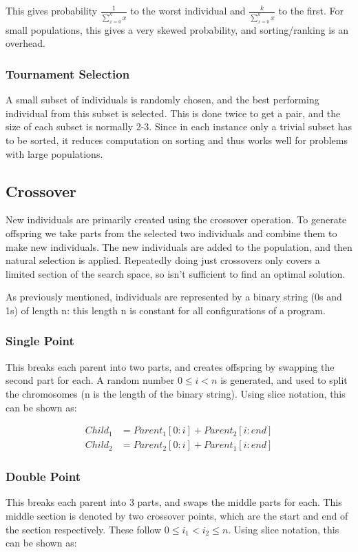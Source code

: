 This gives probability \(\frac{1}{\sum_{x=0}^k x}\) to the worst individual and \(\frac{k}{\sum_{x=0}^k x}\) to the first. For small populations, this gives a very skewed probability, and sorting/ranking is an overhead.

\subsubsection{Tournament Selection}
A small subset of individuals is randomly chosen, and the best performing individual from this subset is selected. This is done twice to get a pair, and the size of each subset is normally 2-3. Since in each instance only a trivial subset has to be sorted, it reduces computation on sorting and thus works well for problems with large populations. 


\subsection{Crossover}
New individuals are primarily created using the crossover operation. To generate offspring we take parts from the selected two individuals and combine them to make new individuals. The new individuals are added to the population, and then natural selection is applied. Repeatedly doing just crossovers only covers a limited section of the search space, so isn't sufficient to find an optimal solution. 

As previously mentioned, individuals are represented by a binary string (0s and 1s) of length n: this length n is constant for all configurations of a program. 

\subsubsection{Single Point}
This breaks each parent into two parts, and creates offspring by swapping the second part for each. A random number \(0\leq i < n\) is generated, and used to split the chromosomes (n is the length of the binary string). Using slice notation, this can be shown as: 

\begin{align}
    Child_1 &= Parent_1[0:i] + Parent_2[i:end] \nonumber\\
    Child_2 &= Parent_2[0:i] + Parent_1[i:end] \nonumber
\end{align}

\subsubsection{Double Point}
This breaks each parent into 3 parts, and swaps the middle parts for each. This middle section is denoted by two crossover points, which are the start and end of the section respectively. These follow \(0\leq i_1 < i_2 \leq n\). Using slice notation, this can be shown as: 

